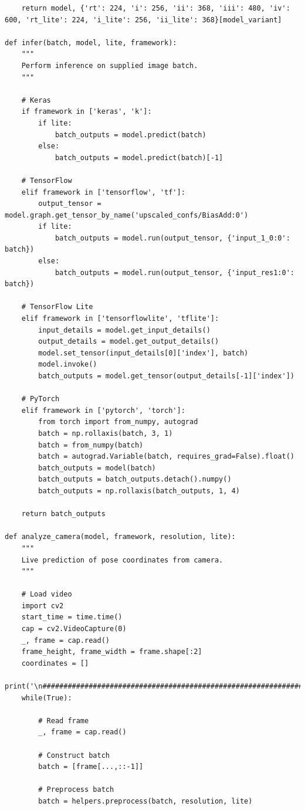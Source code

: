 \documentclass{fisatprojectfinal}
\begin{document}
\begin{appendices}
\begin{lstlisting}
    return model, {'rt': 224, 'i': 256, 'ii': 368, 'iii': 480, 'iv': 600, 'rt_lite': 224, 'i_lite': 256, 'ii_lite': 368}[model_variant]

def infer(batch, model, lite, framework):
    """
    Perform inference on supplied image batch.
    """
    
    # Keras
    if framework in ['keras', 'k']:
        if lite:
            batch_outputs = model.predict(batch)
        else:
            batch_outputs = model.predict(batch)[-1]
    
    # TensorFlow
    elif framework in ['tensorflow', 'tf']:
        output_tensor = model.graph.get_tensor_by_name('upscaled_confs/BiasAdd:0')
        if lite:
            batch_outputs = model.run(output_tensor, {'input_1_0:0': batch})            
        else:
            batch_outputs = model.run(output_tensor, {'input_res1:0': batch})
    
    # TensorFlow Lite
    elif framework in ['tensorflowlite', 'tflite']:
        input_details = model.get_input_details()
        output_details = model.get_output_details()
        model.set_tensor(input_details[0]['index'], batch)
        model.invoke()
        batch_outputs = model.get_tensor(output_details[-1]['index'])
    
    # PyTorch
    elif framework in ['pytorch', 'torch']:
        from torch import from_numpy, autograd
        batch = np.rollaxis(batch, 3, 1)
        batch = from_numpy(batch)
        batch = autograd.Variable(batch, requires_grad=False).float()
        batch_outputs = model(batch)
        batch_outputs = batch_outputs.detach().numpy()
        batch_outputs = np.rollaxis(batch_outputs, 1, 4)
        
    return batch_outputs

def analyze_camera(model, framework, resolution, lite):
    """
    Live prediction of pose coordinates from camera.
    """
    
    # Load video
    import cv2
    start_time = time.time()
    cap = cv2.VideoCapture(0)
    _, frame = cap.read()
    frame_height, frame_width = frame.shape[:2]
    coordinates = []
    print('\n##########################################################################################################')
    while(True):
        
        # Read frame
        _, frame = cap.read()
        
        # Construct batch
        batch = [frame[...,::-1]]
        
        # Preprocess batch
        batch = helpers.preprocess(batch, resolution, lite)


\end{lstlisting}
\end{appendices}
\end{document}
